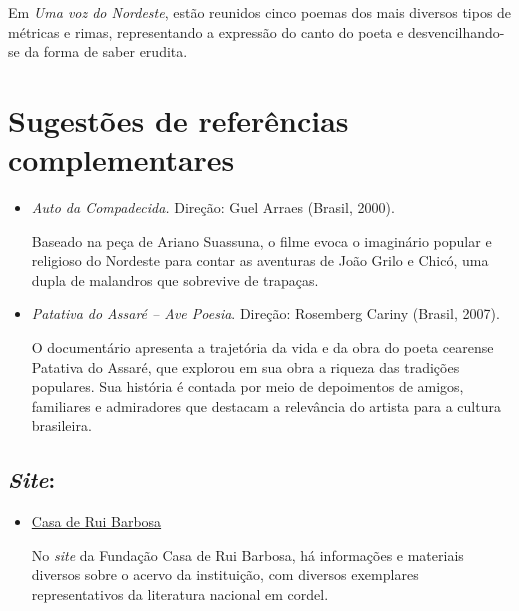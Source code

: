 \documentclass[12pt]{extarticle}
\begin{document}
Em \emph{Uma voz do Nordeste}, estão reunidos cinco poemas dos mais
diversos tipos de métricas e rimas, representando a expressão do canto
do poeta e desvencilhando-se da forma de saber erudita.


\section{Sugestões de referências complementares}\label{sugestoes}

\begin{itemize}

\subsection{Filmes:}

\item \textit{Auto da Compadecida.} Direção: Guel Arraes (Brasil, 2000).

Baseado na peça de Ariano Suassuna, o filme evoca o imaginário popular e
religioso do Nordeste para contar as aventuras de João Grilo e Chicó,
uma dupla de malandros que sobrevive de trapaças.

\item \textit{Patativa do Assaré -- Ave Poesia}. Direção: Rosemberg Cariny
(Brasil, 2007).

O documentário apresenta a trajetória da vida e da obra do poeta
cearense Patativa do Assaré, que explorou em sua obra a riqueza das
tradições populares. Sua história é contada por meio de depoimentos de
amigos, familiares e admiradores que destacam a relevância do artista
para a cultura brasileira.

\end{itemize}

\subsection{\emph{Site}:}

\begin{itemize}

\item \href{http://www.casaruibarbosa.gov.br/cordel/acervo.html}{Casa de Rui Barbosa}

No \emph{site} da Fundação Casa de Rui Barbosa, há informações e
materiais diversos sobre o acervo da instituição, com diversos
exemplares representativos da literatura nacional em cordel.

\end{itemize}
\end{document}
